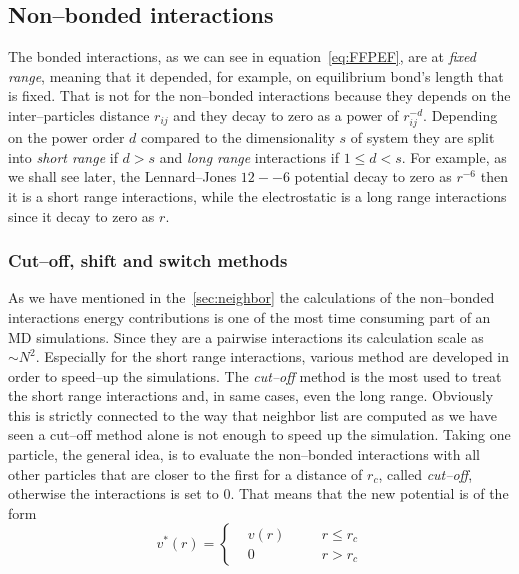 \subsection{Non--bonded interactions}
\label{sec:nonbonded}
The bonded interactions, as we can see in equation~\eqref{eq:FFPEF}, are at \textit{fixed range}, meaning that it depended, for example, on equilibrium bond's length that is fixed. That is not for the non--bonded interactions because they depends on the inter--particles distance $r_{ij}$ and they decay to zero as a power of $r_{ij}^{-d}$. Depending on the power order $d$ compared to the dimensionality $s$ of system they are split into \textit{short range} if $d>s$ and \textit{long range} interactions if $1 \le d < s$. For example, as we shall see later, the Lennard--Jones $12--6$ potential decay to zero as $r^{-6}$ then it is a short range interactions, while the electrostatic is a long range interactions since it decay to zero as $r$.

\subsubsection{Cut--off, shift and switch methods}
As we have mentioned in the~\ref{sec:neighbor} the calculations of the non--bonded interactions energy contributions is one of the most time consuming part of an \ac{MD} simulations. Since they are a pairwise interactions its calculation scale as $\sim N^2$. Especially for the short range interactions, various method are developed in order to speed--up the simulations. The \textit{cut--off} method is the most used to treat the short range interactions and, in same cases, even the long range. Obviously this is strictly connected to the way that neighbor list are computed as we have seen a cut--off method alone is not enough to speed up the simulation. Taking one particle, the general idea, is to evaluate the non--bonded interactions with all other particles that are closer to the first for a distance of $r_c$, called \textit{cut--off}, otherwise the interactions is set to $0$. That means that the new potential is of the form
\begin{equation*}
v^*(r) = \left \{
	\begin{aligned}
&v(r) & \quad & r \le r_c \\
&0    & \quad & r >   r_c
	\end{aligned} \right .
\end{equation*}


